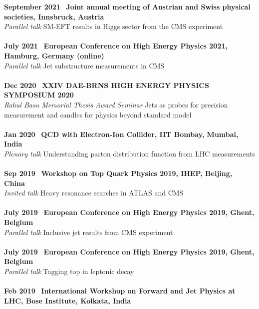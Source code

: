 \documentclass[a4paper,11pt]{article}
\begin{document}
\textbf{September 2021} \ \textbf{Joint annual meeting of Austrian and Swiss physical societies, Innsbruck, Austria} \\
\textit{Parallel talk}\hspace{0.5cm}
SM-EFT results in Higgs sector from the CMS experiment\\
\\
\textbf{July 2021} \ \textbf{European Conference on High Energy Physics 2021, Hamburg, Germany (online)} \\
\textit{Parallel talk}\hspace{0.5cm}
Jet substructure measurements in CMS\\
\\
\textbf{Dec 2020} \ \textbf{XXIV DAE-BRNS HIGH ENERGY PHYSICS SYMPOSIUM 2020} \\
\textit{Rahul Basu Memorial Thesis Award Seminar}\hspace{0.5cm}
Jets as probes for precision measurement and candles for physics beyond standard model\\
\\
\textbf{Jan 2020} \ \textbf{QCD with Electron-Ion Collider, IIT Bombay, Mumbai, India} \\
\textit{Plenary talk}\hspace{0.5cm}
Understanding parton distribution function from LHC measurements\\
\\
\textbf{Sep 2019} \ \textbf{Workshop on Top Quark Physics 2019, IHEP, Beijing, China} \\
\textit{Invited talk}\hspace{0.5cm} 
Heavy resonance searches in ATLAS and CMS \\
\\
\textbf{July 2019} \ \textbf{European Conference on High Energy Physics 2019, Ghent, Belgium} \\
\textit{Parallel talk}\hspace{0.5cm} 
Inclusive jet results from CMS experiment  \\
\\
\textbf{July 2019} \ \textbf{European Conference on High Energy Physics 2019, Ghent, Belgium} \\
\textit{Parallel talk}\hspace{0.5cm}
Tagging top in leptonic decay \\
\\
\textbf{Feb 2019} \ \textbf{International Workshop on Forward and Jet Physics at LHC, Bose Institute, Kolkata, India} \\
\end{document}
